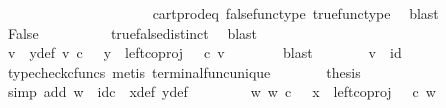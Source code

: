 \begin{isabellebody}
\ \ \ \ \ \ \isamarkupfalse%
\ \isamarkupfalse%
\ {\isachardoublequoteopen}{\isasymt}\ {\isacharequal}{\kern0pt}\ {\isasymf}{\isachardoublequoteclose}\isanewline
\ \ \ \ \ \ \ \ \isamarkupfalse%
\ cart{\isacharunderscore}{\kern0pt}prod{\isacharunderscore}{\kern0pt}eq{}\ false{\isacharunderscore}{\kern0pt}func{\isacharunderscore}{\kern0pt}type\ true{\isacharunderscore}{\kern0pt}func{\isacharunderscore}{\kern0pt}type\ \isamarkupfalse%
\ blast\isanewline
\ \ \ \ \ \ \isamarkupfalse%
\ \isamarkupfalse%
\ False\isanewline
\ \ \ \ \ \ \ \ \isamarkupfalse%
\ true{\isacharunderscore}{\kern0pt}false{\isacharunderscore}{\kern0pt}distinct\ \isamarkupfalse%
\ blast\isanewline
\ \ \ \ \isamarkupfalse%
\isanewline
\ \ \ \ \isamarkupfalse%
\ \isamarkupfalse%
\ v\ \ y{\isacharunderscore}{\kern0pt}def{\isacharcolon}{\kern0pt}\ {\isachardoublequoteopen}v\ {\isasymin}\isactrlsub c\ {\isasymone}\ {\isasymand}\ y\ {\isacharequal}{\kern0pt}\ left{\isacharunderscore}{\kern0pt}coproj\ {\isasymone}\ {\isasymone}\ {\isasymcirc}\isactrlsub c\ v{\isachardoublequoteclose}\isanewline
\ \ \ \ \ \ \isamarkupfalse%
\ blast\isanewline
\ \ \ \ \isamarkupfalse%
\ \isamarkupfalse%
\ {\isachardoublequoteopen}v\ {\isacharequal}{\kern0pt}\ id\ {\isasymone}{\isachardoublequoteclose}\isanewline
\ \ \ \ \ \ \isamarkupfalse%
\ {\isacharparenleft}{\kern0pt}typecheck{\isacharunderscore}{\kern0pt}cfuncs{\isacharcomma}{\kern0pt}\ metis\ terminal{\isacharunderscore}{\kern0pt}func{\isacharunderscore}{\kern0pt}unique{\isacharparenright}{\kern0pt}\isanewline
\ \ \ \ \isamarkupfalse%
\ \isamarkupfalse%
\ {\isacharquery}{\kern0pt}thesis\isanewline
\ \ \ \ \ \ \isamarkupfalse%
\ {\isacharparenleft}{\kern0pt}simp\ add{\isacharcolon}{\kern0pt}\ {\isacartoucheopen}w\ {\isacharequal}{\kern0pt}\ id\isactrlsub c\ {\isasymone}{\isacartoucheclose}\ x{\isacharunderscore}{\kern0pt}def\ y{\isacharunderscore}{\kern0pt}def{\isacharparenright}{\kern0pt}\isanewline
\ \ \isamarkupfalse%
\isanewline
\ \ \ \ \isamarkupfalse%
\ {\isachardoublequoteopen}{\isasymnexists}w{\isachardot}{\kern0pt}\ w\ {\isasymin}\isactrlsub c\ {\isasymone}\ {\isasymand}\ x\ {\isacharequal}{\kern0pt}\ left{\isacharunderscore}{\kern0pt}coproj\ {\isasymone}\ {\isasymone}\ {\isasymcirc}\isactrlsub c\ w{\isachardoublequoteclose}\isanewline

\end{isabellebody}
